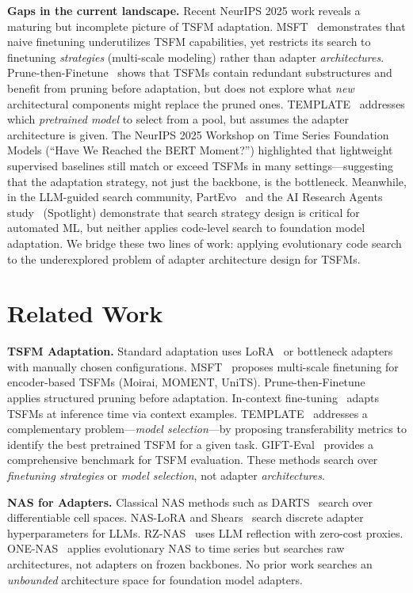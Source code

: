 \documentclass{article}
\begin{document}
\textbf{Gaps in the current landscape.} Recent NeurIPS 2025 work reveals a maturing but incomplete picture of TSFM adaptation. MSFT~\cite{qiao2025msft} demonstrates that naive finetuning underutilizes TSFM capabilities, yet restricts its search to finetuning \textit{strategies} (multi-scale modeling) rather than adapter \textit{architectures}. Prune-then-Finetune~\cite{zhao2025prune} shows that TSFMs contain redundant substructures and benefit from pruning before adaptation, but does not explore what \textit{new} architectural components might replace the pruned ones. TEMPLATE~\cite{zhang2025template} addresses which \textit{pretrained model} to select from a pool, but assumes the adapter architecture is given. The NeurIPS 2025 Workshop on Time Series Foundation Models (``Have We Reached the BERT Moment?'') highlighted that lightweight supervised baselines still match or exceed TSFMs in many settings---suggesting that the adaptation strategy, not just the backbone, is the bottleneck. Meanwhile, in the LLM-guided search community, PartEvo~\cite{hu2025partevo} and the AI Research Agents study~\cite{toledo2025aiagents} (Spotlight) demonstrate that search strategy design is critical for automated ML, but neither applies code-level search to foundation model adaptation. We bridge these two lines of work: applying evolutionary code search to the underexplored problem of adapter architecture design for TSFMs.

\section{Related Work}

\textbf{TSFM Adaptation.} Standard adaptation uses LoRA~\cite{hu2022lora} or bottleneck adapters~\cite{houlsby2019adapters} with manually chosen configurations. MSFT~\cite{qiao2025msft} proposes multi-scale finetuning for encoder-based TSFMs (Moirai, MOMENT, UniTS). Prune-then-Finetune~\cite{zhao2025prune} applies structured pruning before adaptation. In-context fine-tuning~\cite{faw2025icf} adapts TSFMs at inference time via context examples. TEMPLATE~\cite{zhang2025template} addresses a complementary problem---\textit{model selection}---by proposing transferability metrics to identify the best pretrained TSFM for a given task. GIFT-Eval~\cite{woo2024gifteval} provides a comprehensive benchmark for TSFM evaluation. These methods search over \textit{finetuning strategies} or \textit{model selection}, not adapter \textit{architectures}.

\textbf{NAS for Adapters.} Classical NAS methods such as DARTS~\cite{liu2019darts} search over differentiable cell spaces. NAS-LoRA and Shears~\cite{munoz2024shears} search discrete adapter hyperparameters for LLMs. RZ-NAS~\cite{ji2025rznas} uses LLM reflection with zero-cost proxies. ONE-NAS~\cite{li2022onenas} applies evolutionary NAS to time series but searches raw architectures, not adapters on frozen backbones. No prior work searches an \textit{unbounded} architecture space for foundation model adapters.
\end{document}

